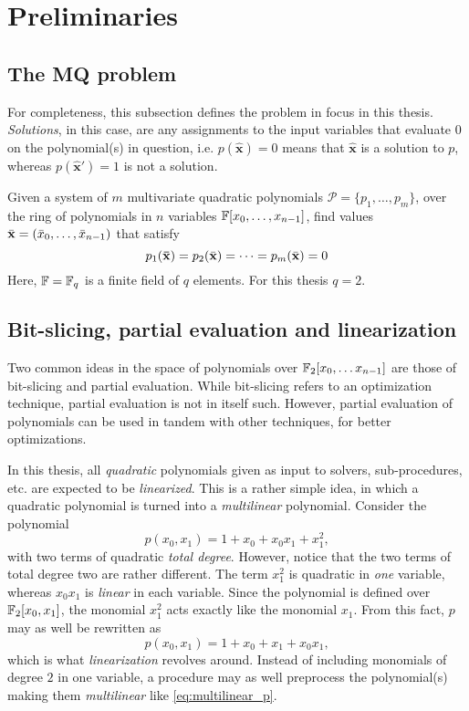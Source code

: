 \section{Preliminaries} \label{sec:prereq}
\subsection{The MQ problem} \label{sec:prereq:problem}
For completeness, this subsection defines the problem in focus in this thesis. \textit{Solutions}, in this case, are any assignments to the input variables that evaluate $0$ on the polynomial(s) in question, i.e. $p(\hat{\mathbf{x}}) = 0$ means that $\hat{\mathbf{x}}$ is a solution to $p$, whereas $p(\hat{\mathbf{x}}') = 1$ is not a solution.
\begin{defn}\label{sec1:def:mq}
    Given a system of $m$ multivariate quadratic polynomials $\mathcal{P} = \{p_{1}, \dots, p_{m}\}$, over the ring of polynomials in $n$ variables $\mathbb{F}[x_0, \dots, x_{n - 1}]$, find values $\Bar{\mathbf{x}} = (\Bar{x}_0, \dots, \Bar{x}_{n - 1})$ that satisfy
    $$
        p_{1}(\mathbf{\Bar{\mathbf{x}}}) =  p_{2}(\Bar{\mathbf{x}}) = \dots = p_{m}(\Bar{\mathbf{x}}) = 0 
    $$
    Here, $\mathbb{F} = \mathbb{F}_q$ is a finite field of $q$ elements. For this thesis $q = 2$.
\end{defn}

\subsection{Bit-slicing, partial evaluation and linearization}
Two common ideas in the space of polynomials over $\mathbb{F}_2[x_0,\dots x_{n - 1}]$ are those of bit-slicing and partial evaluation. While bit-slicing refers to an optimization technique, partial evaluation is not in itself such. However, partial evaluation of polynomials can be used in tandem with other techniques, for better optimizations.

In this thesis, all \textit{quadratic} polynomials given as input to solvers, sub-procedures, etc. are expected to be \textit{linearized}. This is a rather simple idea, in which a quadratic polynomial is turned into a \textit{multilinear} polynomial. Consider the polynomial
$$
    p(x_0, x_1) = 1 + x_0 + x_0x_1 + x_1^2, 
$$
with two terms of quadratic \textit{total degree}. However, notice that the two terms of total degree two are rather different. The term $x_1^2$ is quadratic in \textit{one} variable, whereas $x_0x_1$ is \textit{linear} in each variable. Since the polynomial is defined over $\mathbb{F}_2[x_0,x_1]$, the monomial $x_1^2$ acts exactly like the monomial $x_1$. From this fact, $p$ may as well be rewritten as 
\begin{equation} \label{eq:multilinear_p}
    p(x_0, x_1) = 1 + x_0 + x_1 + x_0x_1,
\end{equation}
which is what \textit{linearization} revolves around. Instead of including monomials of degree $2$ in one variable, a procedure may as well preprocess the polynomial(s) making them \textit{multilinear} like \cref{eq:multilinear_p}.

